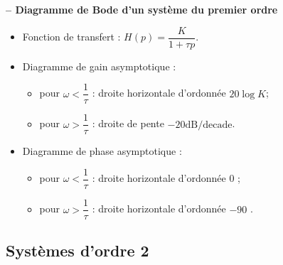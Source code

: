 \begin{resultat}\textbf{\textsf{\small -- Diagramme de Bode d'un système du premier ordre}} 
\begin{itemize}
\item Fonction de transfert : $H(p)=\dfrac{K}{1+\tau p}$.
\item Diagramme de gain asymptotique : 
\begin{itemize}
\item pour $\omega<\dfrac{1}{\tau}$ : droite horizontale d'ordonnée $20 \log K$;
\item pour $\omega>\dfrac{1}{\tau}$ : droite de pente $-{20}\text{dB/decade}$.
\end{itemize}
\item Diagramme de phase asymptotique : 
\begin{itemize}
\item pour $\omega<\dfrac{1}{\tau}$ : droite horizontale d'ordonnée 0 \degre;
\item pour $\omega>\dfrac{1}{\tau}$ : droite horizontale d'ordonnée $-90$ \degre.
\end{itemize}
\end{itemize}
\end{resultat}



\subsection{Systèmes d'ordre 2}

\begin{marginfigure}
\end{marginfigure}

